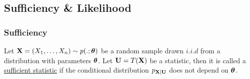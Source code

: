 \subsection{Sufficiency \& Likelihood}
\newcommand{\FacT}{\hyperref[thm:factorisation_theorem]{(\mathrm{{\bf FacT}})}}

\subsubsection{Sufficiency}
\begin{definition}
    Let ${\bf X} = (X_1, \dots, X_n) \sim p(.;\boldsymbol{\theta})$ be a random sample drawn $i.i.d$ from a distribution with parameters $\boldsymbol{\theta}$. Let ${\bf U}=T({\bf X})$ be a statistic, then it is called a \underline{sufficient statistic} if the conditional distribution $p_{{\bf X}|{\bf U}}$ does not depend on $\boldsymbol{\theta}$.
\end{definition}

